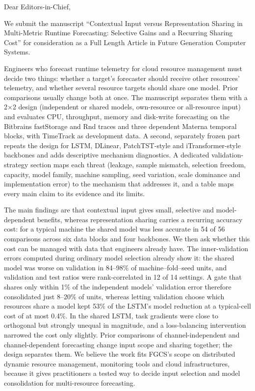 \documentclass[11pt,a4paper]{article}
\begin{document}
Dear Editors-in-Chief,

We submit the manuscript ``Contextual Input versus Representation Sharing in Multi-Metric Runtime Forecasting: Selective Gains and a Recurring Sharing Cost'' for consideration as a Full Length Article in Future Generation Computer Systems.

Engineers who forecast runtime telemetry for cloud resource management must decide two things: whether a target's forecaster should receive other resources' telemetry, and whether several resource targets should share one model. Prior comparisons usually change both at once. The manuscript separates them with a 2$\times$2 design (independent or shared models, own-resource or all-resource input) and evaluates CPU, throughput, memory and disk-write forecasting on the Bitbrains fastStorage and Rnd traces and three dependent Materna temporal blocks, with TimeTrack as development data. A second, separately frozen part repeats the design for LSTM, DLinear, PatchTST-style and iTransformer-style backbones and adds descriptive mechanism diagnostics. A dedicated validation-strategy section maps each threat (leakage, sample mismatch, selection freedom, capacity, model family, machine sampling, seed variation, scale dominance and implementation error) to the mechanism that addresses it, and a table maps every main claim to its evidence and its limits.

The main findings are that contextual input gives small, selective and model-dependent benefits, whereas representation sharing carries a recurring accuracy cost: for a typical machine the shared model was less accurate in 54 of 56 comparisons across six data blocks and four backbones. We then ask whether this cost can be managed with data that engineers already have. The inner-validation errors computed during ordinary model selection already show it: the shared model was worse on validation in 84–98\% of machine–fold–seed units, and validation and test ratios were rank-correlated in 12 of 14 settings. A gate that shares only within 1\% of the independent models' validation error therefore consolidated just 8–20\% of units, whereas letting validation choose which resources share a model kept 53\% of the LSTM's model reduction at a typical-cell cost of at most 0.4\%. In the shared LSTM, task gradients were close to orthogonal but strongly unequal in magnitude, and a loss-balancing intervention narrowed the cost only slightly. Prior comparisons of channel-independent and channel-dependent forecasting change input scope and sharing together; the design separates them. We believe the work fits FGCS's scope on distributed dynamic resource management, monitoring tools and cloud infrastructures, because it gives practitioners a tested way to decide input selection and model consolidation for multi-resource forecasting.
\end{document}
